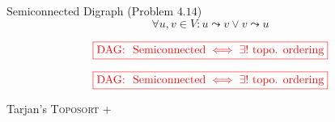 \begin{frame}{}
  \begin{exampleblock}{Semiconnected Digraph (Problem $4.14$)}
    \[
      \forall u,v \in V: u \leadsto v \lor v \leadsto u
    \]
  \end{exampleblock}

  \pause
  \vspace{0.50cm}
  \centerline{}

  \pause
  \vspace{0.50cm}

  \pause
  \[
    \textcolor{red}{\boxed{\text{DAG: } \text{ Semiconnected} \iff \exists! \text{ topo. ordering}}}
  \]
\end{frame}

\begin{frame}{}
  \[
    \textcolor{red}{\boxed{\text{DAG: } \text{ Semiconnected} \iff \exists! \text{ topo. ordering}}}
  \]

  \pause
  \vspace{0.80cm}
  \centerline{Tarjan's \textsc{Toposort} + }

  \pause
  \vspace{0.30cm}
\end{frame}
